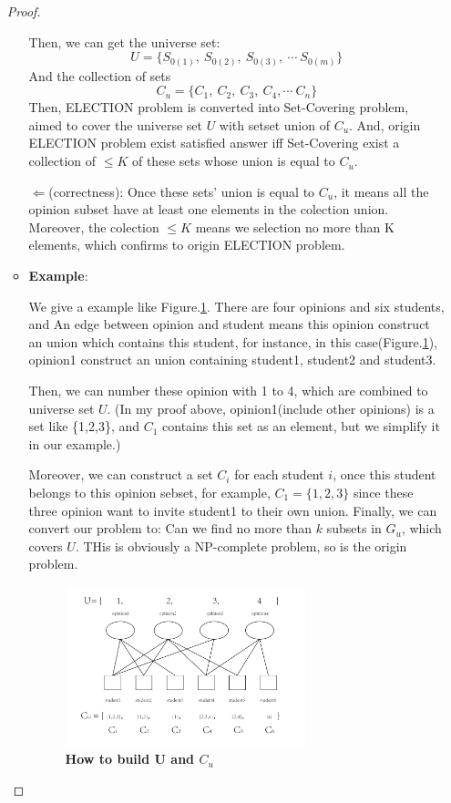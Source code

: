 \documentclass[12pt,a4paper]{article}
\theoremstyle{definition}
\begin{document}
\begin{enumerate}
\begin{proof}
\begin{itemize}
Then, we can get the universe set: $$U=\{S_{0(1)} ,\ S_{0(2)} ,\ S_{0(3)} ,\ \cdots\ S_{0(m)}\} $$
And the collection of sets
$$C_u=\{C_{1},\ C_{2},\ C_{3},\ C_{4},\cdots\ C_{n} \}$$
Then, ELECTION problem is converted into Set-Covering problem, aimed to cover the universe set $U$ with setset union of $C_{u}$. And, origin ELECTION problem exist satisfied answer iff Set-Covering exist a collection of $\leq K$ of these sets whose union is equal to $C_{u}$.\par
$\Leftarrow $(correctness): Once these sets' union is equal to $C_{u}$, it means all the opinion subset have at least one elements in the colection union. Moreover, the colection $\leq K$ means we selection no more than K elements, which confirms to origin ELECTION problem.
\item \textbf{Example}: \par
We give a example like Figure.\ref{Graph4}. There are four opinions and six students, and An edge between opinion and student means this opinion construct an union which contains this student, for instance, in this case(Figure.\ref{Graph4}), opinion1 construct an union containing student1, student2 and student3.\par
Then, we can number these opinion with 1 to 4, which are combined to universe set $U$.  \color{red}(In my proof above, opinion1(include other opinions) is a set like \{1,2,3\}, and $C_{1}$ contains this set as an element, but we simplify it in our example.)\color{black}\par
Moreover, we can construct a set $C_{i}$ for each student $i$, once this student belongs to this opinion sebset, for example, $C_{1}=\{1,2,3\}$ since these three opinion want to invite student1 to their own union. Finally, we can convert our problem to: Can we find no more than $k$ subsets in $G_{u}$, which covers $U$. THis is obviously a NP-complete problem, so is the origin problem.
\begin{figure}[htbp]
        \centering
        \includegraphics[width=0.7\textwidth]{pictures/pic_4.pdf}
        \caption{\textbf{How to build U and $C_{u}$}}\label{Graph4}
\end{figure}
\end{itemize}
\end{proof}

\end{enumerate}

\vspace{20pt}



\end{document}
